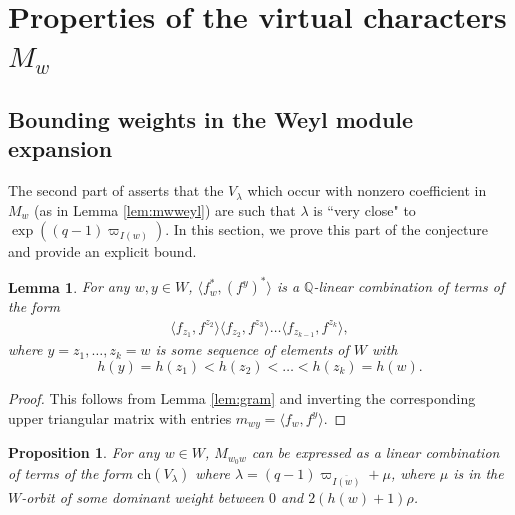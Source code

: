 \documentclass{amsart}
\newtheorem{lemma}[thm]{Lemma}
\newtheorem{prop}[thm]{Proposition}
\theoremstyle{definition}
\begin{document}
\section{Properties of the virtual characters $M_w$}

\subsection{Bounding weights in the Weyl module expansion}

The second part of \cite[Conjecture 2.3]{L} asserts that the $V_{\lambda}$ which occur with nonzero coefficient in $M_w$ (as in Lemma \ref{lem:mwweyl}) are such that $\lambda$ is ``very close" to $\exp((q-1)\varpi_{I(w)})$. In this section, we prove this part of the conjecture and provide an explicit bound.


\begin{lemma}
    For any $w, y \in W$, $\langle f_w^*, (f^y)^*\rangle$ is a $\mathbb{Q}$-linear combination of terms of the form
    \begin{align}
        \langle f_{z_1}, f^{z_2}\rangle\langle f_{z_2}, f^{z_3}\rangle \dots \langle f_{z_{k-1}}, f^{z_k}\rangle,\label{eqn:sequence}
    \end{align}
    where $y = z_1, \dots, z_k = w$ is some sequence of elements of $W$ with $$h(y) = h(z_1) < h(z_2) < \dots < h(z_k) = h(w).$$
\end{lemma}
\begin{proof}
    This follows from Lemma \ref{lem:gram} and inverting the corresponding upper triangular matrix with entries $m_{wy} = \langle f_w, f^y\rangle$.
\end{proof}

\begin{prop}
For any $w \in W$, $M_{w_0w}$ can be expressed as a linear combination of terms of the form $\mathrm{ch}(V_{\lambda})$ where $\lambda = (q - 1)\varpi_{\overline{I(w)}} + \mu$, where $\mu$ is in the $W$-orbit of some dominant weight between $0$ and $2(h(w) + 1)\rho$.
\end{prop}
\end{document}
